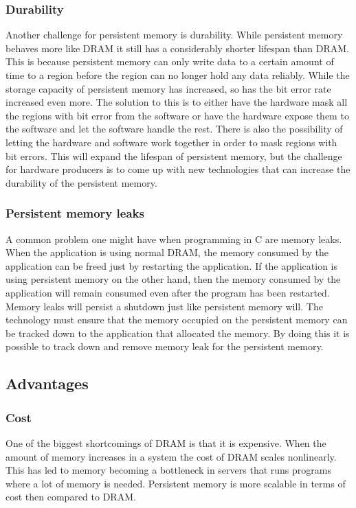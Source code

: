 \documentclass[12pt,a4paper,USenglish]{article}      %
\begin{document}
\subsubsection{Durability}
Another challenge for persistent memory is durability. While persistent memory behaves more like DRAM it still has a considerably shorter lifespan than DRAM\cite{Badam}. This is because persistent memory can only write data to a certain amount of time to a region before the region can no longer hold any data reliably. While the storage capacity of persistent memory has increased, so has the bit error rate increased even more. The solution to this is to either have the hardware mask all the regions with bit error from the software or have the hardware expose them to the software and let the software handle the rest. There is also the possibility of letting the hardware and software work together in order to mask regions with bit errors. This will expand the lifespan of persistent memory, but the challenge for hardware producers is to come up with new technologies that can increase the durability of the persistent memory.

\subsubsection{Persistent memory leaks}
A common problem one might have when programming in C are memory leaks. When the application is using normal DRAM, the memory consumed by the application can be freed just by restarting the application. If the application is using persistent memory on the other hand, then the memory consumed by the application will remain consumed even after the program has been restarted.\cite{Volos}\cite{Swanson} Memory leaks will persist a shutdown just like persistent memory will. The technology must ensure that the memory occupied on the persistent memory can be tracked down to the application that allocated the memory. By doing this it is possible to track down and remove memory leak for the persistent memory.

\subsection{Advantages}
\subsubsection{Cost}
One of the biggest shortcomings of DRAM is that it is expensive. When the amount of memory increases in a system the cost of DRAM scales nonlinearly.\cite{Badam} This has led to memory becoming a bottleneck in servers that runs programs where a lot of memory is needed. Persistent memory is more scalable in terms of cost then compared to DRAM. 
\end{document}
